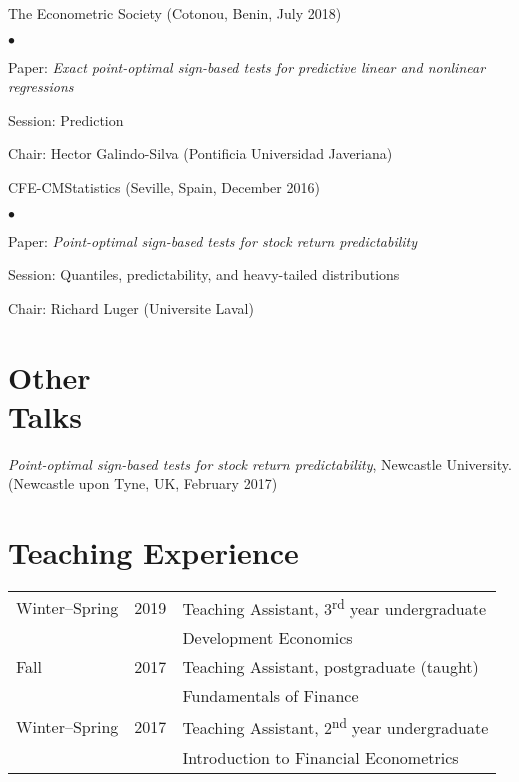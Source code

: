 \documentclass[margin,line,pifont,palatino,courier]{res}
\newcommand{\ts}{\textsuperscript}
\newenvironment{list2}{
  \begin{list}{$\bullet$}{%
      \setlength{\itemsep}{0in}
      \setlength{\parsep}{0in} \setlength{\parskip}{0in}
      \setlength{\topsep}{0in} \setlength{\partopsep}{0in}
      \setlength{\leftmargin}{0.2in}}}{\end{list}}
\begin{document}
\begin{resume}
The Econometric Society (Cotonou, Benin, July 2018)\\
\begin{list2}
\item Paper: \emph{Exact point-optimal sign-based tests for predictive linear and nonlinear regressions}
\item Session: Prediction
\item Chair: Hector Galindo-Silva (Pontificia Universidad Javeriana)
\end{list2}


CFE-CMStatistics (Seville, Spain, December 2016)\\
\begin{list2}
\item Paper: \emph{Point-optimal sign-based tests for stock return predictability}
\item Session: Quantiles, predictability, and heavy-tailed distributions
\item Chair: Richard Luger (Universite Laval)
\end{list2}

\hrulefill

\section{\sc \textbf{Other\\ Talks}}

\emph{Point-optimal sign-based tests for stock return predictability}, Newcastle University. (Newcastle upon Tyne, UK, February 2017)

\hrulefill

\section{\sc \textbf{Teaching Experience}}

\begin{tabular}{@{}p{1.3in}p{0.8in}p{4in}}
Winter--Spring & 2019 &Teaching Assistant, 3\ts{rd} year undergraduate\\
&&Development Economics\\
\rule{0pt}{4ex}Fall & 2017 & Teaching Assistant, postgraduate (taught)\\
&& Fundamentals of Finance\\
\rule{0pt}{4ex}Winter--Spring & 2017 & Teaching Assistant, 2\ts{nd} year undergraduate \\
&&Introduction to Financial Econometrics
\end{tabular}


\end{resume}
\end{document}
